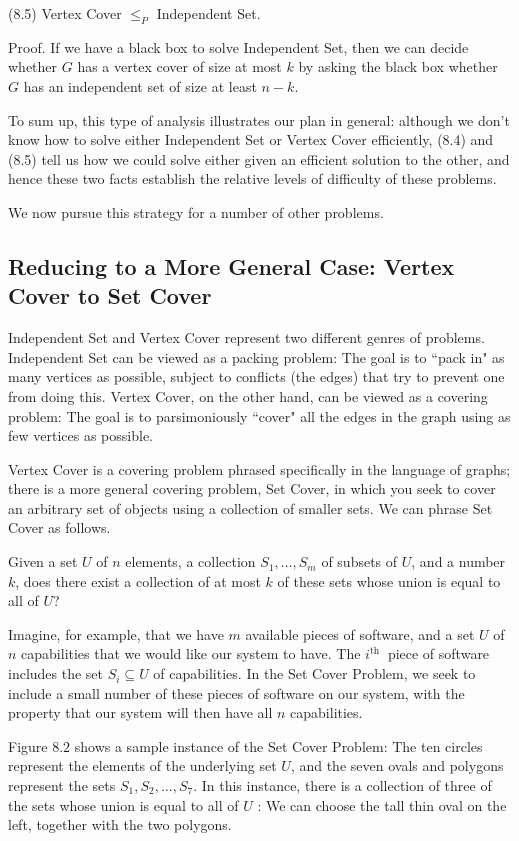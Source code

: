 \documentclass[a4paper, 12pt]{book}
\theoremstyle{dotless}
\begin{document}
(8.5) Vertex Cover $\leq_{P}$ Independent Set.

Proof. If we have a black box to solve Independent Set, then we can decide whether $G$ has a vertex cover of size at most $k$ by asking the black box whether $G$ has an independent set of size at least $n-k$.

To sum up, this type of analysis illustrates our plan in general: although we don't know how to solve either Independent Set or Vertex Cover efficiently, (8.4) and (8.5) tell us how we could solve either given an efficient solution to the other, and hence these two facts establish the relative levels of difficulty of these problems.

We now pursue this strategy for a number of other problems.

\subsection{Reducing to a More General Case: Vertex Cover to Set Cover}
Independent Set and Vertex Cover represent two different genres of problems. Independent Set can be viewed as a packing problem: The goal is to ``pack in" as many vertices as possible, subject to conflicts (the edges) that try to prevent one from doing this. Vertex Cover, on the other hand, can be viewed as a covering problem: The goal is to parsimoniously ``cover" all the edges in the graph using as few vertices as possible.

Vertex Cover is a covering problem phrased specifically in the language of graphs; there is a more general covering problem, Set Cover, in which you seek to cover an arbitrary set of objects using a collection of smaller sets. We can phrase Set Cover as follows.

Given a set $U$ of $n$ elements, a collection $S_{1}, \ldots, S_{m}$ of subsets of $U$, and a number $k$, does there exist a collection of at most $k$ of these sets whose union is equal to all of $U$?

Imagine, for example, that we have $m$ available pieces of software, and a set $U$ of $n$ capabilities that we would like our system to have. The $i^{\text {th }}$ piece of software includes the set $S_{i} \subseteq U$ of capabilities. In the Set Cover Problem, we seek to include a small number of these pieces of software on our system, with the property that our system will then have all $n$ capabilities.

Figure $8.2$ shows a sample instance of the Set Cover Problem: The ten circles represent the elements of the underlying set $U$, and the seven ovals and polygons represent the sets $S_{1}, S_{2}, \ldots, S_{7}$. In this instance, there is a collection of three of the sets whose union is equal to all of $U$ : We can choose the tall thin oval on the left, together with the two polygons.
\end{document}
